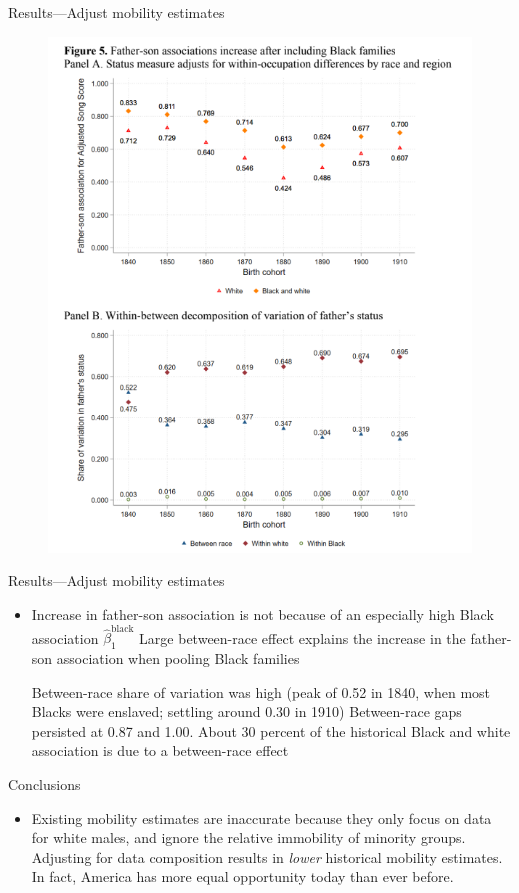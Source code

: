 \documentclass[dvipsnames]{beamer}
\begin{document}
%
\begin{frame}{Results---Adjust mobility estimates}
  \begin{figure}[htp]
    \centering
    \includegraphics[height=0.9\textheight, keepaspectratio=true]{ward_fig5.png}
  \end{figure}
\end{frame}
%
\begin{frame}{Results---Adjust mobility estimates}
  \begin{itemize}
  \item Increase in father-son association is not because of an especially high Black association $\hat{\beta}_1^\text{black}$
    \vitem Large between-race effect explains the increase in the father-son association when pooling Black families
    \begin{enumerate}
    \vitem Between-race share of variation was high (peak of 0.52 in 1840, when  most Blacks were enslaved; settling around 0.30 in 1910)
      \vitem Between-race gaps persisted at 0.87 and 1.00. About 30 percent of the historical Black and white association is due to a between-race effect
    \end{enumerate}
  \end{itemize}
\end{frame}
%
\begin{frame}{Conclusions}
  \begin{itemize}
  \item Existing mobility estimates are inaccurate because they only focus on data for white males, and ignore the relative immobility of minority groups.
    \vitem Adjusting for data composition results in \emph{lower} historical mobility estimates.
    \vitem In fact, America has more equal opportunity today than ever before.
  \end{itemize}
\end{frame}
\end{document}
